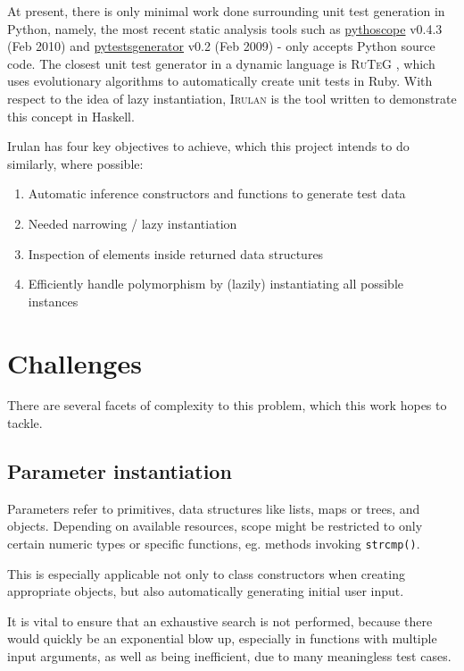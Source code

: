 \documentclass{icldt}
\numberwithin{equation}{section}       %
\begin{document}
At present, there is only minimal work done surrounding unit test generation in Python, namely, the most recent static analysis tools such as \href{http://pythoscope.org/tutorial}{\textsf{pythoscope}} v0.4.3 (Feb 2010) and \href{http://code.google.com/p/pytestsgenerator}{\textsf{pytestsgenerator}} v0.2 (Feb 2009) - only accepts Python source code. The closest unit test generator in a dynamic language is \textsc{RuTeG} \cite{Mairhofer2011}, which uses evolutionary algorithms to automatically create unit tests in Ruby. With respect to the idea of lazy instantiation, \textsc{Irulan} \cite{Allwood2011} is the tool written to demonstrate this concept in Haskell.

Irulan has four key objectives to achieve, which this project intends to do similarly, where possible:
\begin{enumerate}[1.]
	\item Automatic inference constructors and functions to generate test data
	\item Needed narrowing / lazy instantiation
	\item Inspection of elements inside returned data structures
	\item Efficiently handle polymorphism by (lazily) instantiating all possible instances
\end{enumerate}

\section{Challenges}
\label{sect:challenges}
There are several facets of complexity to this problem, which this work hopes to tackle.
\subsection{Parameter instantiation}
Parameters refer to primitives, data structures like lists, maps or trees, and objects. Depending on available resources, scope might be restricted to only certain numeric types or specific functions, eg. methods invoking \texttt{strcmp()}.

This is especially applicable not only to class constructors when creating appropriate objects, but also automatically generating initial user input.

It is vital to ensure that an exhaustive search is not performed, because there would quickly be an exponential blow up, especially in functions with multiple input arguments, as well as being inefficient, due to many meaningless test cases.
\end{document}
